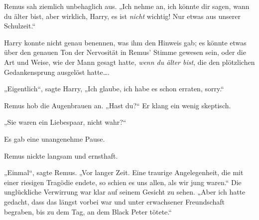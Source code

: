 Remus sah ziemlich unbehaglich aus. „Ich nehme an, ich könnte dir sagen, wann du älter bist, aber wirklich, Harry, es ist \emph{nicht} wichtig! Nur etwas aus unserer Schulzeit.“

Harry konnte nicht genau benennen, was ihm den Hinweis gab; es könnte etwas über den genauen Ton der Nervosität in Remus’ Stimme gewesen sein, oder die Art und Weise, wie der Mann gesagt hatte, \emph{wenn du älter bist}, die den plötzlichen Gedankensprung ausgelöst hatte….

„Eigentlich“, sagte Harry, „Ich glaube, ich habe es schon erraten, sorry.“

Remus hob die Augenbrauen an. „Hast du?“ Er klang ein wenig skeptisch.

„Sie waren ein Liebespaar, nicht wahr?“

Es gab eine unangenehme Pause.

Remus nickte langsam und ernsthaft.

„Einmal“, sagte Remus. „Vor langer Zeit. Eine traurige Angelegenheit, die mit einer riesigen Tragödie endete, so schien es uns allen, als wir jung waren.“ Die unglückliche Verwirrung war klar auf seinem Gesicht zu sehen. „Aber ich hatte gedacht, dass das längst vorbei war und unter erwachsener Freundschaft begraben, bis zu dem Tag, an dem Black Peter tötete.“

